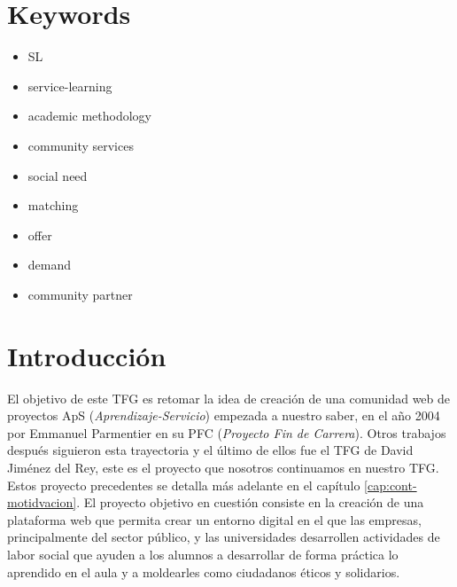 \documentclass[11pt]{book}
\begin{document}
	\chapter*{Keywords} 
	\begin{itemize} 
		\item SL
		\item service-learning
		\item academic methodology
		\item community services
		\item social need
		\item matching
		\item offer
		\item demand
		\item community partner
	\end{itemize}
	
	
	\chapter{Introducción}
	El objetivo de este TFG es retomar la idea de creación de una comunidad web de proyectos ApS (\emph{Aprendizaje-Servicio}) empezada a nuestro saber, en el año 2004 por Emmanuel Parmentier en su PFC (\emph{Proyecto Fin de Carrera}). Otros trabajos después siguieron esta trayectoria y el último de ellos fue el TFG de David Jiménez del Rey, este es el proyecto que nosotros continuamos en nuestro TFG. Estos proyecto precedentes se detalla más adelante en el capítulo \ref{cap:cont-motidvacion}. El proyecto objetivo en cuestión consiste en la creación de una plataforma web que permita crear un entorno digital en el que las empresas, principalmente del sector público, y las universidades desarrollen actividades de labor social que ayuden a los alumnos a desarrollar de forma práctica lo aprendido en el aula y a moldearles como ciudadanos éticos y solidarios.
	
\end{document}
